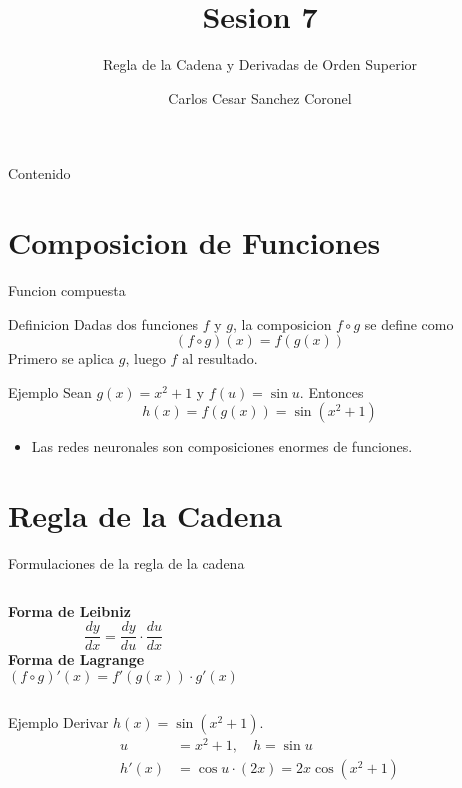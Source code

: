 \documentclass[aspectratio=169, 10pt, xcolor=table]{beamer}
\title[SESION 7 CALCULO]{\textbf{Sesion 7}}
\subtitle{Regla de la Cadena y Derivadas de Orden Superior}
\author[Prof. C. Sanchez]{Carlos Cesar Sanchez Coronel}
\institute{\textbf{CALCULO Y ALGEBRA LINEAL PARA IA}}
\date{}
\begin{document}
\begin{frame}
    \titlepage
\end{frame}

\begin{frame}{Contenido}
    \tableofcontents
\end{frame}

\section{Composicion de Funciones}

\begin{frame}{Funcion compuesta}
    \begin{block}{Definicion}
        Dadas dos funciones $f$ y $g$, la composicion $f\circ g$ se define como
        \[
        (f\circ g)(x) = f(g(x))
        \]
        Primero se aplica $g$, luego $f$ al resultado.
    \end{block}
    \begin{exampleblock}{Ejemplo}
        Sean $g(x)=x^2+1$ y $f(u)=\sin u$. Entonces
        \[
        h(x)=f(g(x))=\sin(x^2+1)
        \]
    \end{exampleblock}
    \begin{itemize}
        \item Las redes neuronales son composiciones enormes de funciones.
    \end{itemize}
\end{frame}

\section{Regla de la Cadena}

\begin{frame}{Formulaciones de la regla de la cadena}
    \begin{columns}[t]
        \textbf{Forma de Leibniz}
        \[
        \frac{dy}{dx} = \frac{dy}{du}\cdot\frac{du}{dx}
        \]
        \textbf{Forma de Lagrange}
        \[
        (f\circ g)'(x) = f'(g(x))\cdot g'(x)
        \]
    \end{columns}
    \vspace{0.3cm}
    \begin{exampleblock}{Ejemplo}
        Derivar $h(x)=\sin(x^2+1)$.
        \begin{align*}
            u &= x^2+1,\quad h=\sin u \\
            h'(x) &= \cos u \cdot (2x) = 2x\cos(x^2+1)
        \end{align*}
    \end{exampleblock}
\end{frame}
\end{document}
